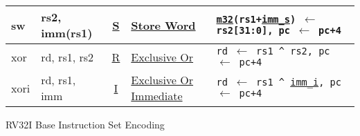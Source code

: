 {\begin{tabular}{|ll|c|l|l|}
\hline
sw    & rs2, imm(rs1) & \hyperref[insnformat:stype]{S} & \hyperref[insn:sw]{Store Word}                  & {\tt \hyperref[memory:m32]{m32}(rs1+\hyperref[imm.s:decode]{imm\_s}) $\leftarrow$ rs2[31:0], pc $\leftarrow$ pc+4}\\
\hline
xor   & rd, rs1, rs2   & \hyperref[insnformat:rtype]{R} & \hyperref[insn:xor]{Exclusive Or}              & {\tt rd $\leftarrow$ rs1 \^{} rs2, pc $\leftarrow$ pc+4}\\
\hline
xori  & rd, rs1, imm  & \hyperref[insnformat:itype]{I} & \hyperref[insn:xori]{Exclusive Or Immediate}    & {\tt rd $\leftarrow$ rs1 \^{} \hyperref[imm.i:decode]{imm\_i}, pc $\leftarrow$ pc+4}\\
\hline
\end{tabular}
}%
\newpage
{\Large RV32I Base Instruction Set Encoding}~\cite[p.~104]{rvismv1v22:2017}

\DrawAllInsnOps
\newpage%
\thispagestyle{empty}%
%
\restoregeometry
